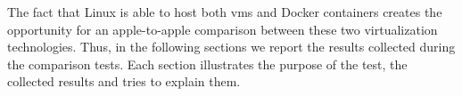 The fact that Linux is able to host both \ac{vm}s and Docker containers creates the opportunity for
an apple-to-apple comparison between these two virtualization technologies. Thus, in the following 
sections we report the results collected during the comparison tests. Each section illustrates the
purpose of the test, the collected results and tries to explain them.










